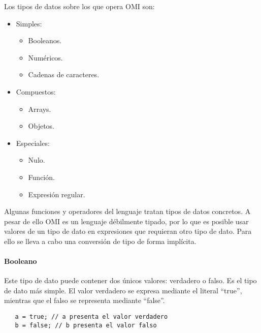 Los tipos de datos sobre los que opera OMI son:
\begin{itemize}
\item Simples:
\begin{itemize}
   \item Booleanos.
   \item Numéricos.
   \item Cadenas de caracteres.
\end{itemize}
\item Compuestos:
\begin{itemize}
   \item Arrays.
   \item Objetos.
\end{itemize}
\item Especiales:
\begin {itemize}
   \item Nulo.
   \item Función.
   \item Expresión regular.
\end{itemize}
\end{itemize}

Algunas funciones y operadores del lenguaje tratan tipos de datos concretos. A pesar de ello OMI es un lenguaje débilmente tipado, por
lo que es posible usar valores de un tipo de dato en expresiones que requieran otro tipo de dato. Para ello se lleva a cabo una conversión de
tipo de forma implícita.

\paragraph{Booleano}\label{sec:type_bool}
Este tipo de dato puede contener dos únicos valores: verdadero o falso. Es el tipo de dato 
más simple. El valor verdadero se expresa mediante el literal ``true'', mientras que el 
falso se representa mediante ``false''. \\

\begin{lstlisting}
   a = true; // a presenta el valor verdadero
   b = false; // b presenta el valor falso
\end{lstlisting}



